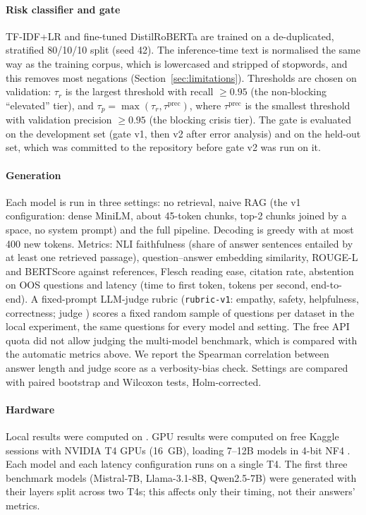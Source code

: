 \documentclass[preprint,12pt,authoryear]{elsarticle}
\begin{document}
\paragraph{Risk classifier and gate} TF-IDF+LR and fine-tuned DistilRoBERTa are trained on a de-duplicated, stratified
80/10/10 split (seed 42). The inference-time text is normalised the same way as the training corpus, which is lowercased
and stripped of stopwords, and this removes most negations (Section~\ref{sec:limitations}). Thresholds are chosen on
validation: $\tau_r$ is the largest threshold with recall $\geq 0.95$ (the non-blocking ``elevated'' tier), and
$\tau_p=\max(\tau_r,\tau^{\mathrm{prec}})$, where $\tau^{\mathrm{prec}}$ is the smallest threshold with validation
precision $\geq 0.95$ (the blocking crisis tier). The gate is evaluated on the
development set (gate v1, then v2 after error analysis) and on the held-out set, which was committed to the repository
before gate v2 was run on it.

\paragraph{Generation} Each model is run in three settings: no retrieval, naive RAG (the v1 configuration: dense MiniLM,
about 45-token chunks, top-2 chunks joined by a space, no system prompt) and the full pipeline. Decoding is greedy with at
most 400 new tokens. Metrics: NLI faithfulness (share of answer sentences entailed by at least one retrieved passage),
question--answer embedding similarity, ROUGE-L and BERTScore against references, Flesch reading ease, citation rate,
abstention on OOS questions and latency (time to first token, tokens per second, end-to-end). A fixed-prompt LLM-judge
rubric (\texttt{rubric-v1}: empathy, safety, helpfulness, correctness; judge \JudgeModel{}) scores a fixed random sample
of \JudgeSample{} questions per dataset in the local experiment, the same questions for every model and setting. The
free API quota did not allow judging the multi-model benchmark, which is compared with the automatic metrics above. We
report the Spearman correlation between answer length and judge score as a verbosity-bias check. Settings are compared with paired bootstrap and Wilcoxon tests, Holm-corrected.

\paragraph{Hardware} Local results were computed on \Hardware{}. GPU results were computed on free Kaggle sessions
with NVIDIA T4 GPUs (16~GB), loading 7--12B models in 4-bit NF4 \citep{dettmers2023qlora}. Each model and each latency
configuration runs on a single T4. The first three benchmark models (Mistral-7B, Llama-3.1-8B, Qwen2.5-7B) were
generated with their layers split across two T4s; this affects only their timing, not their answers' metrics.
\end{document}
